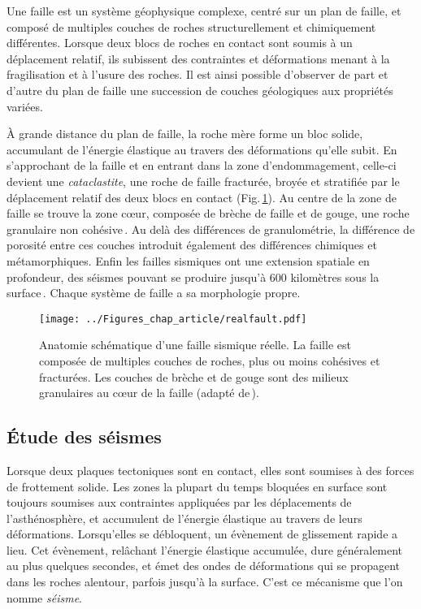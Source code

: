 Une faille est un système géophysique complexe, centré sur un plan de faille, et composé de multiples couches de roches structurellement et chimiquement différentes. Lorsque deux blocs de roches en contact sont soumis à un déplacement relatif, ils subissent des contraintes et déformations menant à la fragilisation et à l'usure des roches. Il est ainsi possible d'observer de part et d'autre du plan de faille une succession de couches géologiques aux propriétés variées.

À grande distance du plan de faille, la roche mère forme un bloc solide, accumulant de l'énergie élastique au travers des déformations qu'elle subit. En s'approchant de la faille et en entrant dans la zone d'endommagement, celle-ci devient une \textit{cataclastite}, une roche de faille fracturée, broyée et stratifiée par le déplacement relatif des deux blocs en contact (Fig.\,\ref{fig:faillereelle}). Au centre de la zone de faille se trouve la zone cœur, composée de brèche de faille et de gouge, une roche granulaire non cohésive\,\cite{woodcock_classification_2008}. Au delà des différences de granulométrie, la différence de porosité entre ces couches introduit également des différences chimiques et métamorphiques. Enfin les failles sismiques ont une extension spatiale en profondeur, des séismes pouvant se produire jusqu'à 600 kilomètres sous la surface\,\cite{frohlich_nature_1989}. Chaque système de faille a sa morphologie propre.


\begin{figure}[h!]
\centering
\texttt{[image: ../Figures\_chap\_article/realfault.pdf]}
\caption[Anatomie d'une faille]{Anatomie schématique d'une faille sismique réelle. La faille est composée de multiples couches de roches, plus ou moins cohésives et fracturées. Les couches de brèche et de gouge sont des milieux granulaires au cœur de la faille (adapté de\,\cite{treffeisen_fault_2021}).}
\label{fig:faillereelle}
\end{figure}



\subsection{Étude des séismes}


Lorsque deux plaques tectoniques sont en contact, elles sont soumises à des forces de frottement solide. Les zones la plupart du temps bloquées en surface sont toujours soumises aux contraintes appliquées par les déplacements de l'asthénosphère, et accumulent de l'énergie élastique au travers de leurs déformations. Lorsqu'elles se débloquent, un évènement de glissement rapide a lieu. Cet évènement, relâchant l'énergie élastique accumulée, dure généralement au plus quelques secondes, et émet des ondes de déformations qui se propagent dans les roches alentour, parfois jusqu'à la surface. C'est ce mécanisme que l'on nomme \textit{séisme}.

